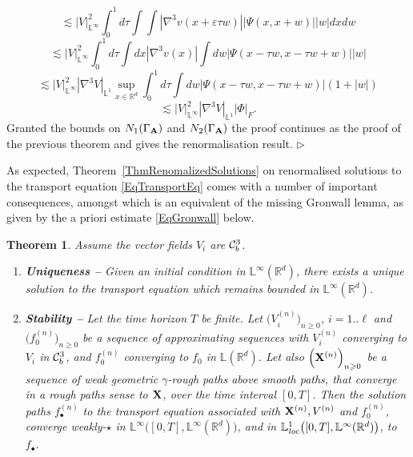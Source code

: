 \documentclass[11pt,a4paper]{amsart}
\newcommand{\RR}{\mathbb{R}}  \newcommand{\CC}{\mathbb{C}}  \newcommand{\LL}{\mathbb{L}}  \newcommand{\WW}{\mathbb{W}}
\renewcommand{\geq}{\geqslant}
\newtheorem{thm}{\hspace{-0.15cm}  {\sc Theorem} } %
\numberwithin{equation}{section} %
\newenvironment{Dem}{%
    \begin{list}{\hspace{0.5cm}{\sc Proof --}}{%
        \setlength{\topsep}{0pt}%
        \setlength{\leftmargin}{0pt}%
        \setlength{\rightmargin}{0pt}%
        \setlength{\listparindent}{0pt}%
        \setlength{\itemindent}{0pt}%
        \setlength{\parsep}{0pt}%
        \addtolength{\leftmargin}{20pt}%
        \addtolength{\rightmargin}{0pt}%
    } \item }{\hfill{\space $\rhd$}\end{list}\smallskip}
\begin{document}
\begin{Dem}
$$
 \lesssim  |V|_{\LL^\infty}^2 \int_0^1 d\tau \int \int |\nabla^3 v(x+\varepsilon \tau w)| |\Psi(x,x+w)| |w| dx dw 
 $$
$$
 \lesssim  |V|_{\LL^\infty}^2 \int_0^1 d\tau \int dx |\nabla^3 v(x)| \int dw  |\Psi(x-\tau w,x-\tau w+w)| |w|
 $$
$$
 \lesssim  |V|_{\LL^\infty}^2 |\nabla^3 V|_{\LL^1} \sup_{x\in\RR^d} \int_0^1 d\tau \int dw  |\Psi(x-\tau w,x-\tau w+w)| (1+|w|)
 $$
$$
 \lesssim  |V|_{\LL^\infty}^2 |\nabla^3 V|_{\LL^1}  |\Phi|_{F}.
 $$
Granted the bounds on $N_1(\Gamma_{\bf A})$ and $N_2(\Gamma_{\bf A})$ the proof continues as the proof of the previous theorem and gives the renormalisation result.
\end{Dem}
 
\medskip

As expected, Theorem~\ref{ThmRenomalizedSolutions} on renormalised solutions to the transport equation \eqref{EqTransportEq} comes with a number of important consequences, amongst which is an equivalent of the missing Gronwall lemma, as given by the a priori estimate \eqref{EqGronwall} below.

\begin{thm}
\label{ThmUniqueness} 
Assume the vector fields $V_i$ are $\mathcal{C}^3_b$. \vspace{0.1cm}
\begin{enumerate}
   \item {\bf Uniqueness --} Given an initial condition in $\LL^\infty(\RR^d)$, there exists a unique solution to the transport equation which remains bounded in $\LL^\infty(\RR^d)$.  \vspace{0.2cm}
   \item {\bf Stability --} Let the time horizon $T$ be finite. Let $\Big(V^{(n)}_i\Big)_{n\geq 0}$, $i=1..\ell$ and $\Big(f^{(n)}_0\Big)_{n\geq 0}$ be a sequence of approximating sequences with $V^{(n)}_i$ converging to $V_i$ in $\mathcal{C}^3_b$, and $f^{(n)}_0$ converging to $f_0$ in $\LL(\RR^d)$. Let also $\Big({\bfX}^{(n)}\Big)_{n\geq 0}$ be a sequence of weak geometric $\gamma$-rough paths above smooth paths, that converge in a rough paths sense to ${\bf X}$, over the time interval $[0,T]$. Then the solution paths $f^{(n)}_\bullet$ to the transport equation associated with ${{\bf X}}^{(n)}, V^{(n)}$ and $f^{(n)}_0$, converge weakly-$\star$ in $\LL^\infty\big([0,T],\LL^\infty(\RR^d)\big)$, and in $\LL^1_\textrm{\emph{loc}}\big([0,T],\LL^\infty(\RR^d)\big)$, to $f_\bullet$.
\end{enumerate}
\end{thm}

\medskip
\end{document}
